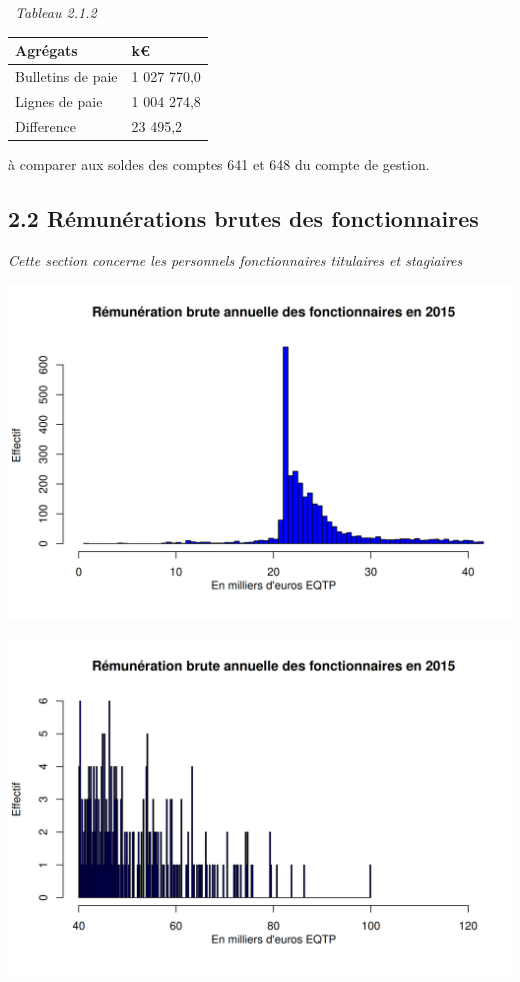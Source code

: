 ~\emph{Tableau 2.1.2}

\begin{longtable}[]{@{}ll@{}}
\toprule
Agrégats & k€\tabularnewline
\midrule
\endhead
Bulletins de paie & 1 027 770,0\tabularnewline
Lignes de paie & 1 004 274,8\tabularnewline
Difference & 23 495,2\tabularnewline
\bottomrule
\end{longtable}

à comparer aux soldes des comptes 641 et 648 du compte de gestion.

\hypertarget{remunerations-brutes-des-fonctionnaires}{%
\subsection{2.2 Rémunérations brutes des
fonctionnaires}\label{remunerations-brutes-des-fonctionnaires}}

\emph{Cette section concerne les personnels fonctionnaires titulaires et
stagiaires}

\includegraphics{altair_files/figure-latex/unnamed-chunk-43-1.png}

\includegraphics{altair_files/figure-latex/unnamed-chunk-43-2.png}

